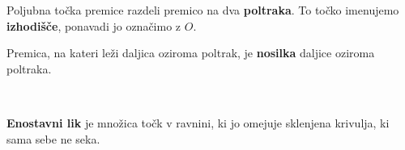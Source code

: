             \begin{definicija}
                Poljubna točka premice razdeli premico na dva \textbf{poltraka}. To točko imenujemo \textbf{izhodišče}, ponavadi jo označimo z $O$.

                \begin{figure}[H]
                    \centering
                \end{figure}
            \end{definicija}

            \begin{definicija}
                Premica, na kateri leži daljica oziroma poltrak, je \textbf{nosilka} daljice oziroma poltraka.
            \end{definicija}
        

            ~
        
            \begin{definicija}
                \textbf{Enostavni lik} je množica točk v ravnini, ki jo omejuje sklenjena krivulja, ki sama sebe ne seka.
            \end{definicija}

